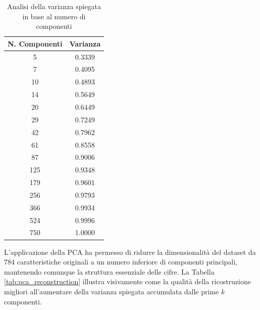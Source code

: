 \documentclass[a4paper,11pt]{article}
\begin{document}
\begin{table}[h]
\footnotesize
\centering
\caption{Analisi della varianza spiegata in base al numero di componenti}
\label{tab:varianza_componenti}
\begin{tabular}{cc}
\hline
\textbf{N. Componenti} & \textbf{Varianza} \\ \hline
5   & 0.3339 \\
7   & 0.4095 \\
10  & 0.4893 \\
14  & 0.5649 \\
20  & 0.6449 \\
29  & 0.7249 \\
42  & 0.7962 \\
61  & 0.8558 \\
87  & 0.9006 \\
125 & 0.9348 \\
179 & 0.9601 \\
256 & 0.9793 \\
366 & 0.9934 \\
524 & 0.9996 \\
750 & 1.0000 \\ \hline
\end{tabular}
\end{table}



L'applicazione della PCA ha permesso di ridurre la dimensionalità del dataset da 784 caratteristiche originali a un numero inferiore di componenti principali, mantenendo comunque la struttura essenziale delle cifre. La Tabella \ref{tab:pca_reconstruction} illustra visivamente come la qualità della ricostruzione migliori all'aumentare della varianza spiegata accumulata dalle prime $k$ componenti.
\end{document}
